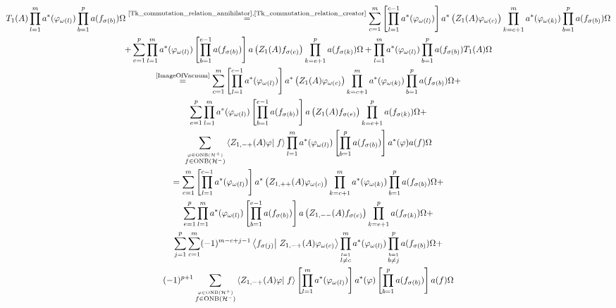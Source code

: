 \documentclass[a4paper,12pt]{article}
\newcommand{\equaltext}[1]{\ensuremath{\stackrel{\text{#1}}{=}}}
\begin{document}
\begin{multline}\label{beginning of image of fixed particle sector}
T_1(A)\prod_{l=1}^m a^*(\varphi_{\omega(l)}) \prod_{b=1}^p a(f_{\sigma(b)}) \Omega
\equaltext{\eqref{Tk_commutation_relation_annihilator},\eqref{Tk_commutation_relation_creator}} \sum_{c=1}^m  \left[\prod_{l=1}^{c-1} a^*(\varphi_{\omega(l)})\right]  a^*\left(Z_1(A)\varphi_{\omega(c)}\right) \prod_{k=c+1}^{m} a^*(\varphi_{\omega(k)})  \prod_{b=1}^p a(f_{\sigma(b)}) \Omega\\
+\sum_{e=1}^p  \prod_{l=1}^{m} a^*(\varphi_{\omega(l)})  \left[ \prod_{b=1}^{e-1} a(f_{\sigma(b)}) \right]  a\left(Z_1(A)f_{\sigma(e)}\right)  \prod_{k=e+1}^{p} a(f_{\sigma(k)}) \Omega +\prod_{l=1}^m a^*(\varphi_{\omega(l)}) \prod_{b=1}^p a(f_{\sigma(b)}) T_1(A)\Omega\\
\equaltext{\eqref{ImageOfVacuum}}\sum_{c=1}^m  \left[\prod_{l=1}^{c-1} a^*(\varphi_{\omega(l)})\right]  a^*\left(Z_1(A)\varphi_{\omega(c)}\right) \prod_{k=c+1}^{m} a^*(\varphi_{\omega(k)})  \prod_{b=1}^p a(f_{\sigma(b)}) \Omega
+\\
\sum_{e=1}^p  \prod_{l=1}^{m} a^*(\varphi_{\omega(l)})  \left[ \prod_{b=1}^{e-1} a(f_{\sigma(b)}) \right]  a\left(Z_1(A)f_{\sigma(e)}\right)  \prod_{k=e+1}^{p} a(f_{\sigma(k)}) \Omega +\\
\sum_{\stackrel{\varphi \in \text{ONB}(\mathcal{H}^+)}{f\in \text{ONB}(\mathcal{H}^-)}}\left<Z_{1,-+}(A)\varphi\right|\left. f\right>
\prod_{l=1}^m a^*(\varphi_{\omega(l)}) \left[\prod_{b=1}^p a(f_{\sigma(b)}) \right]
a^*(\varphi) a(f) \Omega\\
=\sum_{c=1}^m  \left[\prod_{l=1}^{c-1} a^*(\varphi_{\omega(l)})\right]  a^*\left(Z_{1,++}(A)\varphi_{\omega(c)}\right) \prod_{k=c+1}^{m} a^*(\varphi_{\omega(k)})  \prod_{b=1}^p a(f_{\sigma(b)}) \Omega
+\\
\sum_{e=1}^p  \prod_{l=1}^{m} a^*(\varphi_{\omega(l)})  \left[ \prod_{b=1}^{e-1} a(f_{\sigma(b)}) \right]  a\left(Z_{1,--}(A)f_{\sigma(e)}\right)  \prod_{k=e+1}^{p} a(f_{\sigma(k)}) \Omega +\\
\sum_{j=1}^p \sum_{c=1}^m (-1)^{m-c+j-1}   \left<f_{\sigma(j)}\right|\left.Z_{1,-+}(A)\varphi_{\omega(c)}\right> \prod_{\stackrel{l=1}{l\neq c}}^{m} a^*(\varphi_{\omega(l)})  \prod_{\stackrel{b=1}{b\neq j}}^p a(f_{\sigma(b)}) \Omega+\\
(-1)^{p+1}\sum_{\stackrel{\varphi \in \text{ONB}(\mathcal{H}^+)}{f\in \text{ONB}(\mathcal{H}^-)}}\left<Z_{1,-+}(A)\varphi\right|\left. f\right>
\left[\prod_{l=1}^m a^*(\varphi_{\omega(l)})\right] a^*(\varphi)\left[\prod_{b=1}^p a(f_{\sigma(b)}) \right]
 a(f) \Omega
\end{multline}
\end{document}
